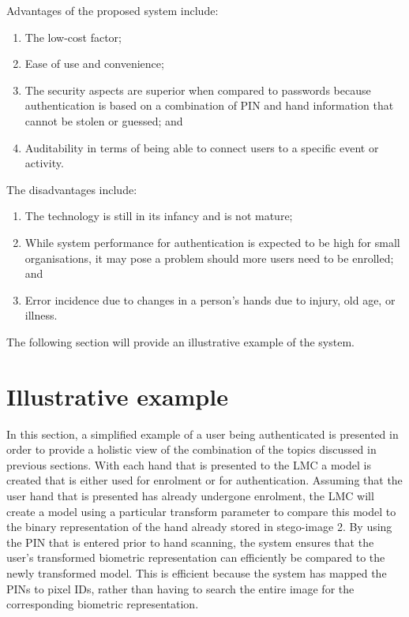 Advantages of the proposed system include:
    \begin{enumerate}[label=\roman*.]
        \item The low-cost factor; 
        \item Ease of use and convenience;
        \item The security aspects are superior when compared to passwords because authentication is based on a combination of PIN and hand information that cannot be stolen or guessed; and
        \item Auditability in terms of being able to connect users to a specific event or activity.
    \end{enumerate}
	
The disadvantages include: 
    \begin{enumerate}[label=\roman*.]
        \item The technology is still in its infancy and is not mature;
        \item While system performance for authentication is expected to be high for small organisations, it may pose a problem should more users need to be enrolled; and
        \item Error incidence due to changes in a person’s hands due to injury, old age, or illness.
    \end{enumerate}

The following section will provide an illustrative example of the system.

\section{Illustrative example}

In this section, a simplified example of a user being authenticated is presented in order to provide a holistic view of the combination of the topics discussed in previous sections.
With each hand that is presented to the LMC a model is created that is either used for enrolment or for authentication. Assuming that the user hand that is presented has already undergone enrolment, the LMC will create a model using a particular transform parameter to compare this model to the binary representation of the hand already stored in stego-image 2. By using the PIN that is entered prior to hand scanning, the system ensures that the user's transformed biometric representation can efficiently be compared to the newly transformed model. This is efficient because the system has mapped the PINs to pixel IDs, rather than having to search the entire image for the corresponding biometric representation.

